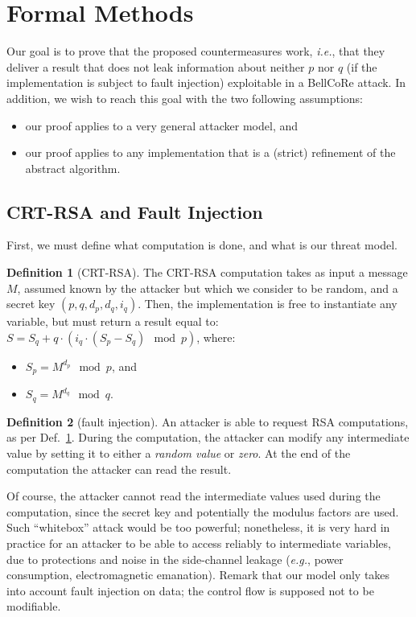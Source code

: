 \documentclass[10pt]{article}
\theoremstyle{definition}
\newtheorem{definition}{Definition}
\theoremstyle{theorem}
\newcommand{\ie}{\textit{i.e.}}
\newcommand{\eg}{\textit{e.g.}}
\begin{document}
\section{Formal Methods}
\label{sec-methods}

Our goal is to prove that the proposed countermeasures work,
\ie, that they deliver a result that does not leak information about neither $p$ nor $q$ (if the implementation is subject to fault injection) exploitable in a BellCoRe attack.
In addition, we wish to reach this goal with the two following assumptions:

\begin{itemize}
\item our proof applies to a very general attacker model, and
\item our proof applies to any implementation that is a (strict) refinement of the abstract algorithm.
\end{itemize}

\subsection{CRT-RSA and Fault Injection}
\label{sec-methods-rsa}

First, we must define what computation is done, and what is our threat model.

\begin{definition}[CRT-RSA]
The CRT-RSA computation takes as input a message $M$,
assumed known by the attacker but which we consider to be random,
and a secret key $(p, q, d_p, d_q, i_q)$.
Then, the implementation is free to instantiate any variable, but must return a result equal to:
$S = S_q + q \cdot (i_q \cdot (S_p - S_q) \mod p)$, where:
\begin{itemize}
\item $S_p = M^{d_p} \mod p$, and
\item $S_q = M^{d_q} \mod q$.
\end{itemize}
\label{def-crtrsa}
\end{definition}

\begin{definition}[fault injection]
An attacker is able to request RSA computations, as per Def.~\ref{def-crtrsa}.
During the computation, the attacker can modify any intermediate value by setting it to either a \emph{random value} or \emph{zero}.
At the end of the computation the attacker can read the result.
\label{def-faultinj}
\end{definition}
Of course, the attacker cannot read the intermediate values used during the computation,
since the secret key and potentially the modulus factors are used.
Such ``whitebox'' attack would be too powerful;
nonetheless, it is very hard in practice for an attacker to be able to access reliably to intermediate variables,
due to protections and noise in the side-channel leakage (\eg, power consumption, electromagnetic emanation).
Remark that our model only takes into account fault injection on data;
the control flow is supposed not to be modifiable.
\end{document}
